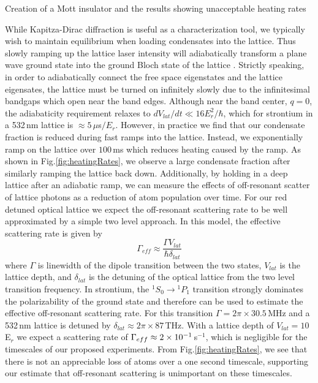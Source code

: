 Creation of a Mott insulator and the results showing unacceptable heating rates

While Kapitza-Dirac diffraction is useful as a characterization tool, we typically wish to maintain equilibrium when loading condensates into the lattice. Thus slowly ramping up the lattice laser intensity will adiabatically transform a plane wave ground state into the ground Bloch state of the lattice \cite{Sakurai2010}. Strictly speaking, in order to adiabatically connect the free space eigenstates and the lattice eigensates, the lattice must be turned on infinitely slowly due to the infinitesimal bandgaps which open near the band edges. Although near the band center, $q=0$, the adiabaticity requirement relaxes to $dV_{lat}/dt \ll 16E_r^2/ \hbar$, \cite{Denschlag2002} which for strontium in a 532\,nm lattice is $\approx 5\,\mu$s$/E_r$. However, in practice we find that our condensate fraction is reduced during fast ramps into the lattice. Instead, we exponentially ramp on the lattice over $100\,$ms which reduces heating caused by the ramp. As shown in Fig.\;\ref{fig:heatingRates}, we observe a large condensate fraction after similarly ramping the lattice back down. Additionally, by holding in a deep lattice after an adiabatic ramp, we can measure the effects of off-resonant scatter of lattice photons as a reduction of atom population over time. For our red detuned optical lattice we expect the off-resonant scattering rate to be well approximated by a simple two level approach. In this model, the effective scattering rate is given by \cite{Jaksch2005}
	\begin{equation} \label{eq:offResScatter}
		\Gamma_{eff} \approx \frac{\Gamma V_{lat}}{\hbar \delta_{lat}}
	\end{equation}
where $\Gamma$ is linewidth of the dipole transition between the two states, $V_{lat}$ is the lattice depth, and $\delta_{lat}$ is the detuning of the optical lattice from the two level transition frequency. In strontium, the $^1S_0\!\rightarrow\!^1P_1$ transition strongly dominates the polarizability of the ground state and therefore can be used to estimate the effective off-resonant scattering rate. For this transition $\Gamma = 2 \pi \times 30.5\,$MHz and a 532\,nm lattice is detuned by $\delta_{lat} \approx 2 \pi \times 87\,$THz. With a lattice depth of $V_{lat}=10\,$E$_r$ we expect a scattering rate of $\Gamma_{eff} \approx 2\times 10^{-1}\,$s$^{-1}$, which is negligible for the timescales of our proposed experiments. From Fig.\;\ref{fig:heatingRates}, we see that there is not an appreciable loss of atoms over a one second timescale, supporting our estimate that off-resonant scattering is unimportant on these timescales.


